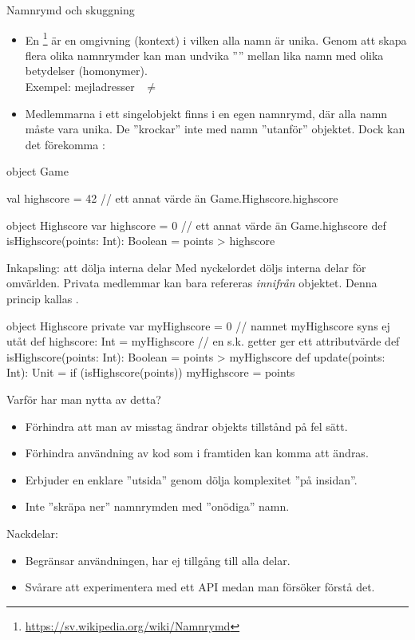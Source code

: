 \begin{Slide}{Namnrymd och skuggning}
\begin{itemize}\SlideFontSmall
  \item En \footnote{\url{https://sv.wikipedia.org/wiki/Namnrymd}}   är en omgivning (kontext) i vilken alla namn är unika. Genom att skapa flera olika namnrymder
  kan man undvika '''' mellan lika namn med olika betydelser (homonymer). \\
  Exempel: mejladresser   ~$\neq$~  
  \item Medlemmarna i ett singelobjekt finns i en egen namnrymd,
  där alla namn måste vara unika. De ''krockar'' inte med namn ''utanför'' objektet. Dock kan det förekomma  :
\end{itemize}
\begin{Code}
object Game {

  val highscore = 42   // ett annat värde än Game.Highscore.highscore

  object Highscore {
    var highscore = 0  // ett annat värde än Game.highscore
    def isHighscore(points: Int): Boolean = points > highscore
  }
}
\end{Code}

\end{Slide}



\begin{Slide}{Inkapsling: att dölja interna delar}\SlideFontSmall
Med nyckelordet  döljs interna delar för omvärlden.
Privata medlemmar kan bara refereras \emph{innifrån} objektet.
Denna princip kallas  .
\begin{CodeSmall}
object Highscore {
  private var myHighscore = 0        // namnet myHighscore syns ej utåt
  def highscore: Int = myHighscore   // en s.k. getter ger ett attributvärde
  def isHighscore(points: Int): Boolean = points > myHighscore
  def update(points: Int): Unit = if (isHighscore(points)) myHighscore = points
}
\end{CodeSmall}
\pause
Varför har man nytta av detta?
\begin{itemize}
  \item Förhindra att man av misstag ändrar objekts tillstånd på fel sätt.
  \item Förhindra användning av kod som i framtiden kan komma att ändras.
  \item Erbjuder en enklare ''utsida'' genom dölja komplexitet ''på insidan''.
  \item Inte ''skräpa ner'' namnrymden med ''onödiga'' namn.
\end{itemize}
Nackdelar:
\begin{itemize}
  \item Begränsar användningen, har ej tillgång till alla delar.
  \item Svårare att experimentera med ett API medan man försöker förstå det.
\end{itemize}
\end{Slide}




